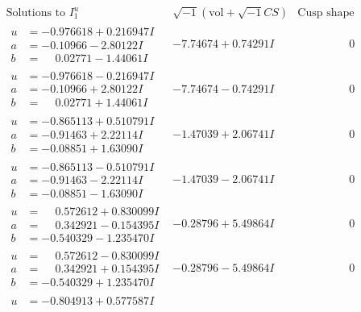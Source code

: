 \documentclass[1p]{elsarticle_modified}
\theoremstyle{definition}
\newcommand{\I}{\sqrt{-1}}
\begin{document}
$$\begin{array}{c|c|c}  
\text{Solutions to }I^u_{1}& \I (\text{vol} + \sqrt{-1}CS) & \text{Cusp shape}\\
 \hline 
\begin{aligned}
u &= -0.976618 + 0.216947 I \\
a &= -0.10966 - 2.80122 I \\
b &= \phantom{-}0.02771 - 1.44061 I\end{aligned}
 & -7.74674 + 0.74291 I & \phantom{-0.000000 } 0 \\ \hline\begin{aligned}
u &= -0.976618 - 0.216947 I \\
a &= -0.10966 + 2.80122 I \\
b &= \phantom{-}0.02771 + 1.44061 I\end{aligned}
 & -7.74674 - 0.74291 I & \phantom{-0.000000 } 0 \\ \hline\begin{aligned}
u &= -0.865113 + 0.510791 I \\
a &= -0.91463 + 2.22114 I \\
b &= -0.08851 + 1.63090 I\end{aligned}
 & -1.47039 + 2.06741 I & \phantom{-0.000000 } 0 \\ \hline\begin{aligned}
u &= -0.865113 - 0.510791 I \\
a &= -0.91463 - 2.22114 I \\
b &= -0.08851 - 1.63090 I\end{aligned}
 & -1.47039 - 2.06741 I & \phantom{-0.000000 } 0 \\ \hline\begin{aligned}
u &= \phantom{-}0.572612 + 0.830099 I \\
a &= \phantom{-}0.342921 - 0.154395 I \\
b &= -0.540329 - 1.235470 I\end{aligned}
 & -0.28796 + 5.49864 I & \phantom{-0.000000 } 0 \\ \hline\begin{aligned}
u &= \phantom{-}0.572612 - 0.830099 I \\
a &= \phantom{-}0.342921 + 0.154395 I \\
b &= -0.540329 + 1.235470 I\end{aligned}
 & -0.28796 - 5.49864 I & \phantom{-0.000000 } 0 \\ \hline\begin{aligned}
u &= -0.804913 + 0.577587 I \\

\end{aligned}
\end{array}$$
\end{document}
